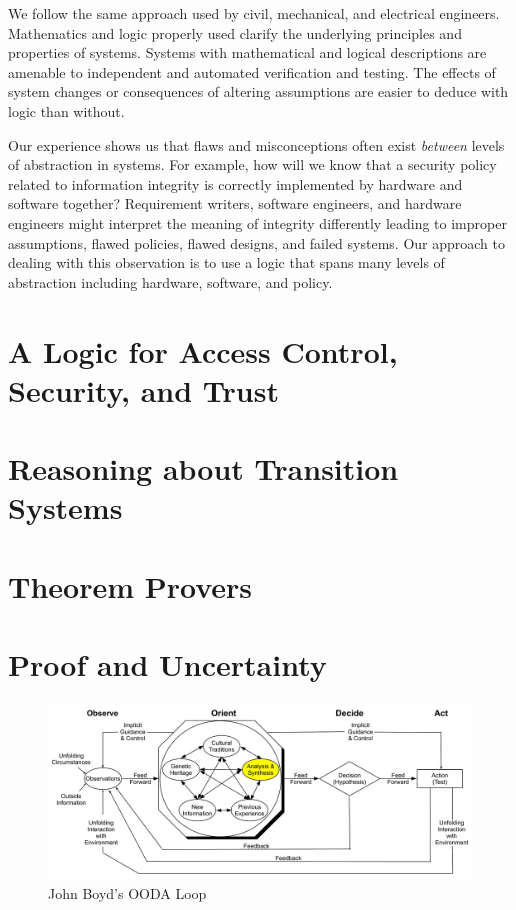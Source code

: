 We follow the same approach used by civil, mechanical, and electrical
engineers. Mathematics and logic properly used clarify the underlying
principles and properties of systems. Systems with mathematical and
logical descriptions are amenable to independent and automated
verification and testing. The effects of system changes or
consequences of altering assumptions are easier to deduce with logic
than without.

Our experience shows us that flaws and misconceptions often exist
\emph{between} levels of abstraction in systems.  For example, how
will we know that a security policy related to information integrity
is correctly implemented by hardware and software together?
Requirement writers, software engineers, and hardware engineers might
interpret the meaning of integrity differently leading to improper
assumptions, flawed policies, flawed designs, and failed systems. Our
approach to dealing with this observation is to use a logic that spans
many levels of abstraction including hardware, software, and
policy.

\section{A Logic for Access Control, Security, and Trust}
\label{sec:acl-language}

\section{Reasoning about Transition Systems}
\label{sec:transition-systems}

\section{Theorem Provers}
\label{sec:theorem-provers}

\section{Proof and Uncertainty}
\label{sec:proof-uncertainty}


\begin{figure}[tb]
  \centering
  \includegraphics[width=0.9\linewidth]{Figures/Introduction/OODA}
  \caption{John Boyd's OODA Loop}
  \label{fig:ooda-loop}
\end{figure}

